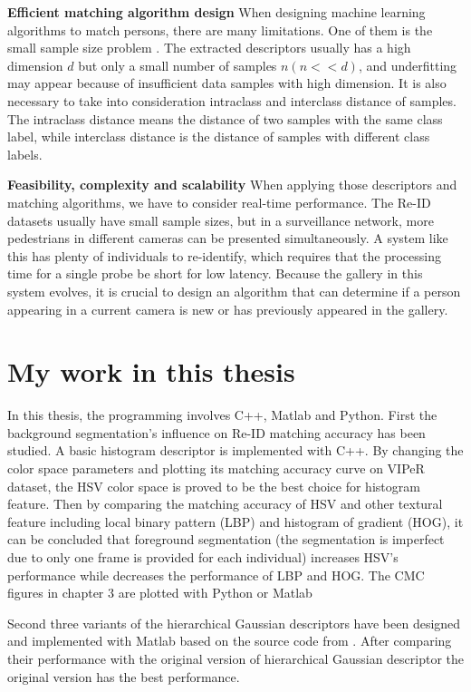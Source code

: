 \textbf{Efficient matching algorithm design} 	
When designing machine learning algorithms to match persons, there are many limitations. One of them is the small sample size problem \cite{NFST}. The extracted descriptors usually has a high dimension $d$ but only a small number of samples $n(n<<d)$, and underfitting may appear because of insufficient data samples with high dimension. It is also necessary to take into consideration intraclass and interclass distance of samples. The intraclass distance means the distance of two samples with the same class label, while interclass distance is the distance of samples with different class labels. 

\textbf{Feasibility, complexity and scalability} When applying those descriptors and matching algorithms, we have to consider real-time performance. The Re-ID datasets usually have small sample sizes, but in a surveillance network, more pedestrians in different cameras can be presented simultaneously. A system like this has plenty of individuals to re-identify, which requires that the processing time for a single probe be short for low latency. Because the gallery in this system evolves, it is crucial to design an algorithm that can determine if a person appearing in a current camera is new or has previously appeared in the gallery.

\section{My work in this thesis}

In this thesis, the programming involves C++, Matlab and Python. First the background segmentation's influence on Re-ID matching accuracy has been studied. A basic histogram descriptor is implemented with C++. By changing the color space parameters and plotting its matching accuracy curve on VIPeR dataset, the HSV color space is proved to be the best choice for histogram feature. Then by comparing the matching accuracy of HSV and other textural feature including local binary pattern (LBP) and histogram of gradient (HOG), it can be concluded that foreground segmentation (the segmentation is imperfect due to only one frame is provided for each individual) increases HSV's performance while decreases the performance of LBP and HOG. The CMC figures in chapter 3 are plotted with Python or Matlab

Second three variants of the hierarchical Gaussian descriptors have been designed and implemented with Matlab based on the source code from \cite{GOG}. After comparing their performance with the original version of hierarchical Gaussian descriptor the original version has the best performance.
 
